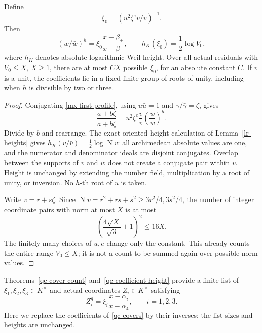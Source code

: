 \begin{lemma}\label{mx-actual-coefficient}
Define
\[
 \xi_0=(u^2\zeta^e v/\bar v)^{-1}.
\]
Then
\begin{equation}\label{mx-first-kummer}
 (w/\bar w)^h=\xi_0\frac{x-\beta_+}{x-\beta_-},
 \qquad h_K(\xi_0)=\frac12\log V_0,
\end{equation}
where $h_K$ denotes absolute logarithmic Weil height. Over all actual
residuals with $V_0\le X$, $X\ge1$, there are at most $CX$
possible $\xi_0$, for an absolute constant $C$. If $v$ is a unit,
the coefficients lie in a fixed finite group of roots of unity,
including when $h$ is divisible by two or three.
\end{lemma}
\begin{proof}
Conjugating \eqref{mx-first-profile}, using $u\bar u=1$ and
$\gamma/\bar\gamma=\zeta$, gives
\[
 \frac{a+b\zeta}{a+b\bar\zeta}
   =u^2\zeta^e\frac{v}{\bar v}
      \left(\frac w{\bar w}\right)^h.
\]
Divide by $b$ and rearrange. The exact oriented-height calculation
of Lemma~\ref{lr-heights} gives
$h_K(v/\bar v)=\tfrac12\log\operatorname N v$:
all archimedean absolute values are one, and the numerator and
denominator ideals are disjoint conjugates. Overlap between the
supports of $v$ and $w$ does not create a conjugate pair within $v$.
Height is unchanged by extending the number field, multiplication
by a root of unity, or inversion. No $h$-th root of $u$ is taken.

Write $v=r+s\zeta$. Since
$\operatorname N v=r^2+rs+s^2\ge3r^2/4,3s^2/4$, the number of
integer coordinate pairs with norm at most $X$ is at most
\[
 \left(\frac{4\sqrt X}{\sqrt3}+1\right)^2\le16X.
\]
The finitely many choices of $u,e$ change only the constant.
This already counts the entire range $V_0\le X$; it is not a
count to be summed again over possible norm values.
\end{proof}

Theorems~\ref{qc-cover-count} and~\ref{qc-coefficient-height}
provide a finite list of $\xi_1,\xi_2,\xi_3\in K^\times$ and
actual coordinates $Z_i\in K^\times$ satisfying
\begin{equation}\label{mx-second-kummer}
 Z_i^g=\xi_i\frac{x-\alpha_i}{x-\alpha_4},\qquad i=1,2,3.
\end{equation}
Here we replace the coefficients of \eqref{qc-covers} by their
inverses; the list sizes and heights are unchanged.

